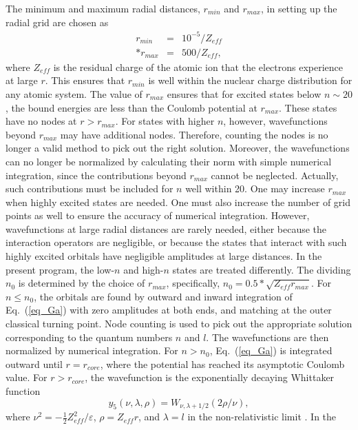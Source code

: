 The minimum and maximum radial distances, $r_{min}$ and $r_{max}$, in setting
up the radial grid are chosen as 
\begin{eqnarray}
r_{min} &=& 10^{-5}/Z_{eff} \nonumber \\*
r_{max} &=& 500/Z_{eff},
\end{eqnarray}
where $Z_{eff}$ is the residual charge of the atomic ion that the electrons
experience at large $r$. This ensures that $r_{min}$ is well within the
nuclear charge distribution for any atomic system. The value of
$r_{max}$ ensures that for excited states below $n \sim 20$, the bound energies
are less than the Coulomb potential at $r_{max}$. These states have no nodes at
$r > r_{max}$. For states with higher $n$, however, wavefunctions beyond
$r_{max}$ may have additional nodes. Therefore, counting the nodes is no
longer a valid method to pick out the right solution. Moreover, the
wavefunctions can no longer be normalized by calculating their norm with simple
numerical integration, since the contributions beyond $r_{max}$ cannot be
neglected. Actually, such contributions must be included for $n$ well within
20. One may increase $r_{max}$ when highly excited states are needed. One
must also increase the number of grid points as well to
ensure the accuracy of numerical integration. However, wavefunctions
at large radial distances are rarely needed, either because the interaction
operators are negligible, or because the states that interact with
such highly excited orbitals have negligible amplitudes at large distances. 
In the present program, the low-$n$ and high-$n$ states are treated
differently. The dividing $n_0$ is determined by the choice of $r_{max}$,
specifically, $n_0
= 0.5*\sqrt{Z_{eff}r_{max}}$. For $n \le n_0$, the orbitals are found by
outward and inward integration of Eq.~(\ref{eq_Ga}) with zero amplitudes at
both ends, and matching at the outer classical turning point. Node counting is
used to pick out the appropriate solution corresponding to the quantum numbers
$n$ and $l$. The wavefunctions are then normalized by 
numerical integration. For $n > n_0$, Eq.~(\ref{eq_Ga}) is integrated
outward until $r=r_{core}$, where the potential has reached its asymptotic
Coulomb value. For $r > r_{core}$, the wavefunction is the exponentially
decaying Whittaker function 
\begin{equation}
y_5(\nu, \lambda, \rho) = W_{\nu, \lambda+1/2}(2\rho/\nu),
\end{equation}
where $\nu^2 = -\frac{1}{2}Z_{eff}^2/\varepsilon$, $\rho = Z_{eff}r$, and
$\lambda = l$ in the non-relativistic limit \cite{seaton58}. In the
